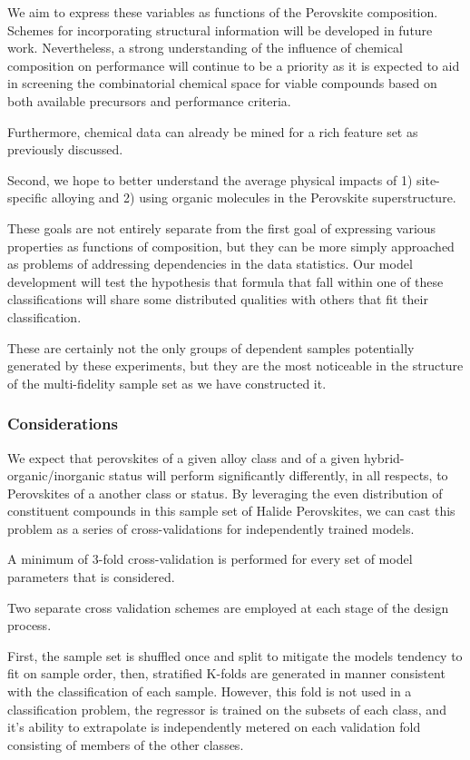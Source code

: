 \documentclass[11pt]{article}
\begin{document}
We aim to express these variables as functions of the Perovskite
composition. Schemes for incorporating structural information will be
developed in future work. Nevertheless, a strong understanding of the
influence of chemical composition on performance will continue to be a
priority as it is expected to aid in screening the combinatorial
chemical space for viable compounds based on both available precursors
and performance criteria.

Furthermore, chemical data can already be mined for a rich feature set
as previously discussed.

Second, we hope to better understand the average physical impacts
of 1) site-specific alloying and 2) using organic molecules in the
Perovskite superstructure.

These goals are not entirely separate from the first goal of
expressing various properties as functions of composition, but they
can be more simply approached as problems of addressing dependencies
in the data statistics. Our model development will test the hypothesis
that formula that fall within one of these classifications will share
some distributed qualities with others that fit their classification.

These are certainly not the only groups of dependent samples
potentially generated by these experiments, but they are the most
noticeable in the structure of the multi-fidelity sample set as we
have constructed it.
\subsubsection{Considerations}
\label{sec:org8d694c8}
We expect that perovskites of a given alloy class and of a given
hybrid-organic/inorganic status will perform significantly
differently, in all respects, to Perovskites of a another class or
status. By leveraging the even distribution of constituent compounds
in this sample set of Halide Perovskites, we can cast this problem as
a series of cross-validations for independently trained models.

A minimum of 3-fold cross-validation is performed for every set of
model parameters that is considered. 

Two separate cross validation schemes are employed at each stage of
the design process.

First, the sample set is shuffled once and split to mitigate the
models tendency to fit on sample order, then, stratified K-folds are
generated in manner consistent with the classification of each
sample. However, this fold is not used in a classification problem,
the regressor is trained on the subsets of each class, and it's
ability to extrapolate is independently metered on each validation
fold consisting of members of the other classes.
\end{document}
